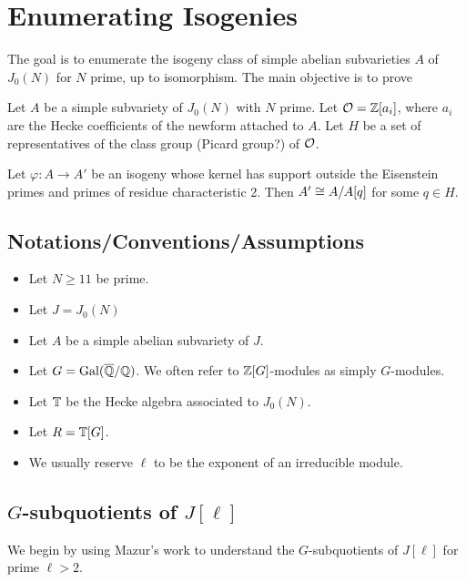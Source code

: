 \documentclass{article}
\begin{document}
\section{Enumerating Isogenies}

The goal is to enumerate the isogeny class of simple abelian subvarieties $A$
of $J_0(N)$ for $N$ prime, up to isomorphism. The main objective is to prove

\begin{theorem}
    Let $A$ be a simple subvariety of $J_0(N)$ with $N$ prime. Let
    $\mathcal{O}=\mathbb{Z}[a_i]$, where $a_i$ are the Hecke coefficients of the newform
    attached to $A$. Let $H$ be a set of representatives of the class group
    (Picard group?) of $\mathcal{O}$.

    Let $\varphi:A\to A'$ be an isogeny whose kernel has support outside the
    Eisenstein primes and primes of residue characteristic 2. Then $A'\cong
    A/A[q]$ for some $q\in H$.
\end{theorem}


\subsection{Notations/Conventions/Assumptions}

\begin{itemize}
    \item
        Let $N\geq 11$ be prime.
    \item
        Let $J=J_0(N)$
    \item
        Let $A$ be a simple abelian subvariety of $J$.
    \item
        Let $G=\operatorname{Gal}(\overline{\mathbb{Q}}/\mathbb{Q})$. We often refer to $\mathbb{Z}[G]$-modules as simply
        $G$-modules.
    \item
        Let $\mathbb{T}$ be the Hecke algebra associated to $J_0(N)$.
    \item
        Let $R=\mathbb{T}[G]$.
    \item
        We usually reserve $\ell$ to be the exponent of an irreducible module.
\end{itemize}

\subsection{$G$-subquotients of $J[\ell]$}

We begin by using Mazur's work to understand the $G$-subquotients of $J[\ell]$
for prime $\ell>2$.
\end{document}
